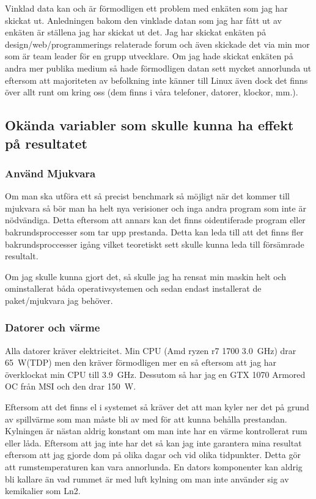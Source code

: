 \documentclass[12pt, a4paper]{report}
\begin{document}
Vinklad data kan och är förmodligen ett problem med enkäten som jag har skickat ut. Anledningen bakom den vinklade datan som jag har fått ut av enkäten är ställena jag har skickat ut det. Jag har skickat enkäten på design/web/programmerings relaterade forum och även skickade det via min mor som är team leader för en grupp utvecklare. Om jag hade skickat enkäten på andra mer publika medium så hade förmodligen datan sett mycket annorlunda ut eftersom att majoriteten av befolkning inte känner till Linux även dock det finns över allt runt om kring oss (dem finns i våra telefoner, datorer, klockor, mm.). 

\subsection{Okända variabler som skulle kunna ha effekt på resultatet}


\subsubsection{Använd Mjukvara}

Om man ska utföra ett så precist benchmark så möjligt när det kommer till mjukvara så bör man ha helt nya verisioner och inga andra program som inte är nödvändiga. Detta eftersom att annars kan det finns oidentiferade program eller bakrundsproccesser som tar upp prestanda. Detta kan leda till att det finns fler bakrundsproccesser igång vilket teoretiskt sett skulle kunna leda till försämrade resultalt.

Om jag skulle kunna gjort det, så skulle jag ha rensat min maskin helt och ominstallerat båda operativsystemen och sedan endast installerat de paket/mjukvara jag behöver.

\subsubsection{Datorer och värme}

Alla datorer kräver elektricitet. Min CPU (Amd ryzen r7 1700 \SI{3.0}{\giga\hertz}) drar \SI{65}{\watt}(TDP)\cite{ryzen1700spec} men den kräver förmodligen mer en så eftersom att jag har överklockat min CPU till \SI{3.9}{\giga\hertz}.
Dessutom så har jag en GTX 1070 Armored OC från MSI\cite{1070} och den drar \SI{150}{\watt}.

Eftersom att det finns el i systemet så kräver det att man kyler ner det på grund av spillvärme\cite{wasteheat} som man måste bli av med för att kunna behålla prestandan. Kylningen är nästan aldrig konstant om man inte har en värme kontrollerat rum eller låda. Eftersom att jag inte har det så kan jag inte garantera mina resultat eftersom att jag gjorde dom på olika dagar och vid olika tidpunkter. Detta gör att rumstemperaturen kan vara annorlunda. En dators komponenter kan aldrig bli kallare än vad rummet är med luft kylning\cite{thermodynamics} om man inte använder sig av kemikalier som Ln2.
\end{document}
